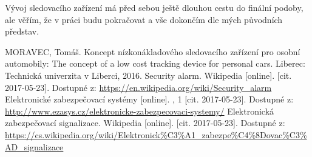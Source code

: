 \documentclass[FM,MP]{tulthesis}  %
\begin{document}
Vývoj sledovacího zařízení má před sebou ještě dlouhou cestu do finální podoby, ale věřím, že v práci budu pokračovat a vše dokončím dle mých původních představ.


\begin{thebibliography}{10}
MORAVEC, Tomáš. Koncept nízkonákladového sledovacího zařízení pro osobní automobily: The concept of a low cost tracking device for personal cars. Liberec: Technická univerzita v Liberci, 2016.
Security alarm. Wikipedia [online]. [cit. 2017-05-23]. Dostupné z: \url{https://en.wikipedia.org/wiki/Security_alarm}
Elektronické zabezpečovací systémy [online]. , 1 [cit. 2017-05-23]. Dostupné z: \url{http://www.ezasys.cz/elektronicke-zabezpecovaci-systemy/}
Elektronická zabezpečovací signalizace. Wikipedia [online]. [cit. 2017-05-23]. Dostupné z: \url{https://cs.wikipedia.org/wiki/Elektronick\%C3\%A1\_zabezpe\%C4\%8Dovac\%C3\%AD_signalizace}








\end{thebibliography}
\end{document}
